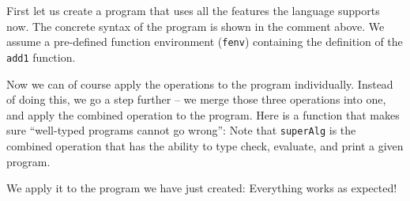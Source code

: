 First let us create a program that uses all the features the language supports
now.
The concrete syntax of the program is shown in the comment above. We assume a
pre-defined function environment (\lstinline{fenv}) containing the definition of
the \lstinline{add1} function.

Now we can of course apply the operations to the program individually. Instead
of doing this, we go a step further -- we merge those three operations into one,
and apply the combined operation to the program. Here is a function that makes
sure ``well-typed programs cannot go wrong'':
Note that \lstinline{superAlg} is the combined operation that has the ability to
type check, evaluate, and print a given program.

We apply it to the program we have just created:
Everything works as expected!
